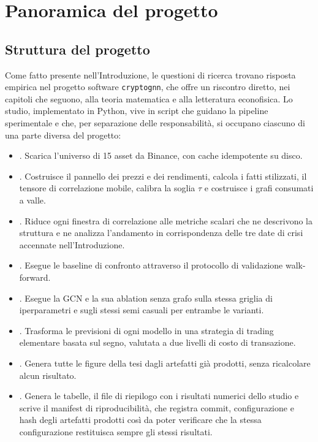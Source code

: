 \chapter*{Panoramica del progetto}
\label{ch:project-overview}

\let\oldthesection\thesection
\let\oldtheHsection\theHsection
\renewcommand{\thesection}{\arabic{section}}
\renewcommand{\theHsection}{po.\arabic{section}}
\setcounter{section}{0}

\section{Struttura del progetto}
\label{sec:project-structure}

Come fatto presente nell'Introduzione, le questioni di ricerca trovano risposta empirica nel progetto software \texttt{cryptognn}, che offre un riscontro diretto, nei capitoli che seguono, alla teoria matematica e alla letteratura econofisica. Lo studio, implementato in Python, vive in script che guidano la pipeline sperimentale e che, per separazione delle responsabilità, si occupano ciascuno di una parte diversa del progetto:

\begin{itemize}
    \item {}. Scarica l'universo di 15 asset da Binance, con cache idempotente su disco.
    \item {}. Costruisce il pannello dei prezzi e dei rendimenti, calcola i fatti stilizzati, il tensore di correlazione mobile, calibra la soglia $\tau$ e costruisce i grafi consumati a valle.
    \item {}. Riduce ogni finestra di correlazione alle metriche scalari che ne descrivono la struttura e ne analizza l'andamento in corrispondenza delle tre date di crisi accennate nell'Introduzione.
    \item {}. Esegue le baseline di confronto attraverso il protocollo di validazione walk-forward.
    \item {}. Esegue la GCN e la sua ablation senza grafo sulla stessa griglia di iperparametri e sugli stessi semi casuali per entrambe le varianti.
    \item {}. Trasforma le previsioni di ogni modello in una strategia di trading elementare basata sul segno, valutata a due livelli di costo di transazione.
    \item {}. Genera tutte le figure della tesi dagli artefatti già prodotti, senza ricalcolare alcun risultato.
    \item {}. Genera le tabelle, il file di riepilogo con i risultati numerici dello studio e scrive il manifest di riproducibilità, che registra commit, configurazione e hash degli artefatti prodotti così da poter verificare che la stessa configurazione restituisca sempre gli stessi risultati.
\end{itemize}

